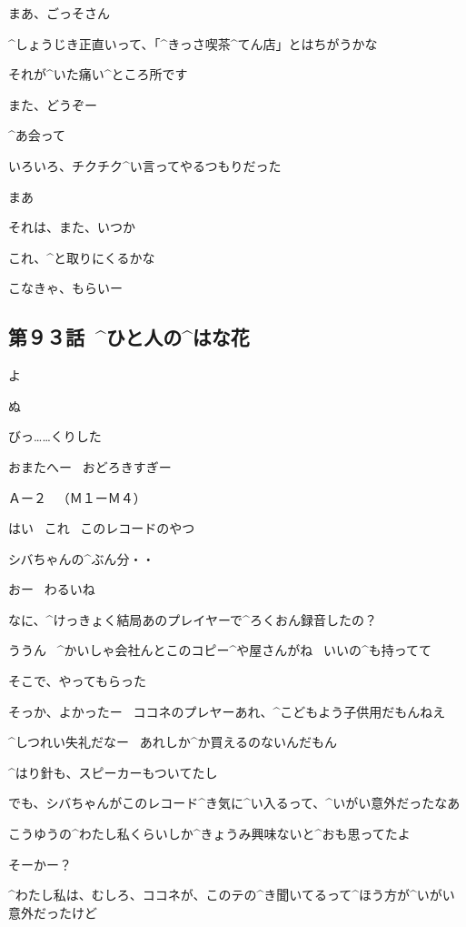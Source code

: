 \Maruko まあ、ごっそさん

\Maruko ^{しょうじき}{正直}いって、「^{きっさ}{喫茶}^{てん}{店}」とはちがうかな

\Alpha それが^{いた}{痛}い^{ところ}{所}です

\page[69]
\Alpha また、どうぞー

\Maruko ^{あ}{会}って

\Maruko いろいろ、チクチク^{い}{言}ってやるつもりだった

\page[70]
\Maruko まあ

\Maruko それは、また、いつか

\Alpha これ、^{と}{取}りにくるかな

\Alpha こなきゃ、もらいー


\subsection{第９３話\ ^{ひと}{人}の^{はな}{花}}

\page[73]
\Shiba よ

\Shiba ぬ

\Kokone びっ……くりした

\Shiba おまたへー
\ おどろきすぎー

\page[74]
\Sign Ａー２
\ （Ｍ１ーＭ４）

\Kokone はい
\ これ
\ このレコードのやつ

\Kokone シバちゃんの^{ぶん}{分}・・

\Shiba おー
\ わるいね

\Shiba なに、^{けっきょく}{結局}あのプレイヤーで^{ろくおん}{録音}したの？

\Kokone ううん
\ ^{かいしゃ}{会社}んとこのコピー^{や}{屋}さんがね
\  いいの^{も}{持}ってて

\Kokone そこで、やってもらった

\Shiba そっか、よかったー
\ ココネのプレヤーあれ、^{こどもよう}{子供用}だもんねえ

\Kokone ^{しつれい}{失礼}だなー
\ あれしか^{か}{買}えるのないんだもん

\Kokone ^{はり}{針}も、スピーカーもついてたし

\page[75]
\Kokone でも、シバちゃんがこのレコード^{き}{気}に^{い}{入}るって、^{いがい}{意外}だったなあ

\Kokone こうゆうの^{わたし}{私}くらいしか^{きょうみ}{興味}ないと^{おも}{思}ってたよ

\Shiba そーかー？

\Shiba ^{わたし}{私}は、むしろ、ココネが、このテの^{き}{聞}いてるって^{ほう}{方}が^{いがい}{意外}だったけど

